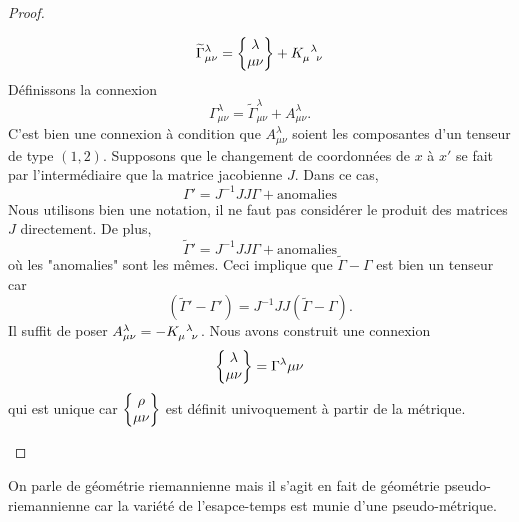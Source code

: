 \documentclass[a4paper,11pt]{report}
\begin{document}
\begin{proof}
\begin{enumerate}[label = \textit{\roman*)}]
\begin{equation}
                        \widetilde{\Gamma}^\lambda_{\mu\nu}=\chris{\lambda}{\mu}{\nu}+K\indices{_\mu^\lambda_\nu}
                        \end{equation}
                        Définissons la connexion
                        \begin{equation}
                            \Gamma^\lambda_{\mu\nu} = \widetilde{\Gamma}^\lambda_{\mu\nu} + A^\lambda_{\mu\nu}.
                        \end{equation}
                        C'est bien une connexion à condition que $A^\lambda_{\mu\nu}$ soient les composantes d'un tenseur de type $(1,2)$. Supposons que le changement de coordonnées de $x$ à $x'$ se fait par l'intermédiaire que la matrice jacobienne $J$. Dans ce cas,
                        \begin{equation}
                            \Gamma' = J^{-1}JJ\Gamma + \text{anomalies}
                        \end{equation}
                        Nous utilisons bien une notation, il ne faut pas considérer le produit des matrices $J$ directement. De plus,
                        \begin{equation}
                            \widetilde{\Gamma}' = J^{-1}JJ\Gamma + \text{anomalies}
                        \end{equation}
                        où les "anomalies" sont les mêmes. Ceci implique que $\widetilde{\Gamma}-\Gamma$ est bien un tenseur car
                        \begin{equation}
                            (\widetilde{\Gamma}'-\Gamma') = J^{-1}JJ(\widetilde{\Gamma}-\Gamma).
                        \end{equation}
                        Il suffit de poser $A^\lambda_{\mu\nu}=-K\indices{_\mu^\lambda_\nu}$. Nous avons construit une connexion
                        \begin{equation}
                            \begin{Bmatrix}\lambda\\\mu\nu\end{Bmatrix}=\Gamma^\lambda{\mu\nu}
                        \end{equation}
                        qui est unique car $\begin{Bmatrix}\rho\\\mu\nu\end{Bmatrix}$ est définit univoquement à partir de la métrique.
                    \end{enumerate}
                \end{proof}
                
                \begin{rmk}
                    On parle de géométrie riemannienne mais il s'agit en fait de géométrie pseudo-riemannienne car la variété de l'esapce-temps est munie d'une pseudo-métrique.
                \end{rmk}
                
\end{document}
